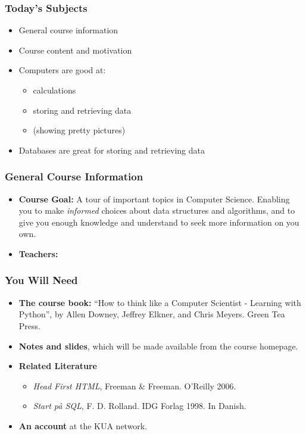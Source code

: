 \documentclass[dvipsnames,handout]{beamer}
\subtitle{Introduction To \sql{}}
\begin{document}
\begin{frame}
  \titlepage{}
\end{frame}

\begin{frame}

\frametitle{Today's Subjects}

\begin{itemize}
\item General course information
\item Course content and motivation
\item Computers are good at:
  \begin{itemize}
  \item calculations
  \item storing and retrieving data
  \item (showing pretty pictures)
  \end{itemize}

\item Databases are great for storing and retrieving data

\end{itemize}
\end{frame}


\begin{frame}
\frametitle{General Course Information}

\begin{itemize}
\item \textbf{Course Goal:} A tour of important topics in Computer
  Science.  Enabling you to make \emph{informed} choices about data
  structures and algorithms, and to give you enough knowledge and
  understand to seek more information on you own.

\item \textbf{Teachers:} \undervisernavne{}
\end{itemize}
\end{frame}


\begin{frame}
\frametitle{You Will Need}

\begin{itemize}
\item \textbf{The course book:} ``How to think like a Computer
  Scientist - Learning with Python'', by Allen Downey, Jeffrey Elkner,
  and Chris Meyers. Green Tea Press.
\item \textbf{Notes and slides}, which will be made available from the
  course homepage.
\item \textbf{Related Literature}
  \begin{itemize}
  \item \textit{Head First HTML}, Freeman \& Freeman. O'Reilly 2006.
  \item \emph{Start på SQL}, F. D. Rolland. IDG Forlag 1998. In Danish.
\end{itemize}
\item \textbf{An account} at the KUA network.
\end{itemize}
\end{frame}
\end{document}

